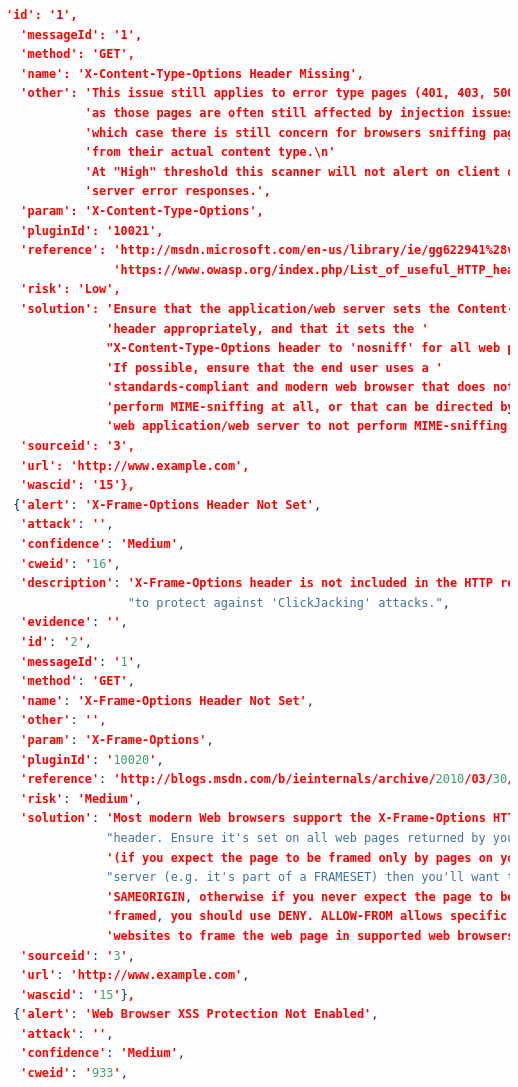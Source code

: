 \begin{lstlisting}[language=json,label={lst:owas_zap_welcome_message_alerts},caption={Alerts showed with NGINX default configuration}]
  'id': '1',
  'messageId': '1',
  'method': 'GET',
  'name': 'X-Content-Type-Options Header Missing',
  'other': 'This issue still applies to error type pages (401, 403, 500, etc) '
           'as those pages are often still affected by injection issues, in '
           'which case there is still concern for browsers sniffing pages away '
           'from their actual content type.\n'
           'At "High" threshold this scanner will not alert on client or '
           'server error responses.',
  'param': 'X-Content-Type-Options',
  'pluginId': '10021',
  'reference': 'http://msdn.microsoft.com/en-us/library/ie/gg622941%28v=vs.85%29.aspx\n'
               'https://www.owasp.org/index.php/List_of_useful_HTTP_headers',
  'risk': 'Low',
  'solution': 'Ensure that the application/web server sets the Content-Type '
              'header appropriately, and that it sets the '
              "X-Content-Type-Options header to 'nosniff' for all web pages.\n"
              'If possible, ensure that the end user uses a '
              'standards-compliant and modern web browser that does not '
              'perform MIME-sniffing at all, or that can be directed by the '
              'web application/web server to not perform MIME-sniffing.',
  'sourceid': '3',
  'url': 'http://www.example.com',
  'wascid': '15'},
 {'alert': 'X-Frame-Options Header Not Set',
  'attack': '',
  'confidence': 'Medium',
  'cweid': '16',
  'description': 'X-Frame-Options header is not included in the HTTP response '
                 "to protect against 'ClickJacking' attacks.",
  'evidence': '',
  'id': '2',
  'messageId': '1',
  'method': 'GET',
  'name': 'X-Frame-Options Header Not Set',
  'other': '',
  'param': 'X-Frame-Options',
  'pluginId': '10020',
  'reference': 'http://blogs.msdn.com/b/ieinternals/archive/2010/03/30/combating-clickjacking-with-x-frame-options.aspx',
  'risk': 'Medium',
  'solution': 'Most modern Web browsers support the X-Frame-Options HTTP '
              "header. Ensure it's set on all web pages returned by your site "
              '(if you expect the page to be framed only by pages on your '
              "server (e.g. it's part of a FRAMESET) then you'll want to use "
              'SAMEORIGIN, otherwise if you never expect the page to be '
              'framed, you should use DENY. ALLOW-FROM allows specific '
              'websites to frame the web page in supported web browsers).',
  'sourceid': '3',
  'url': 'http://www.example.com',
  'wascid': '15'},
 {'alert': 'Web Browser XSS Protection Not Enabled',
  'attack': '',
  'confidence': 'Medium',
  'cweid': '933',

\end{lstlisting}
